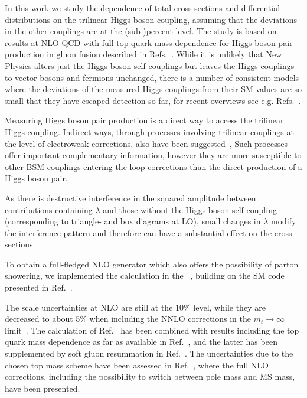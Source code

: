 \medskip

In this work we study the dependence of total cross sections and differential distributions on the trilinear Higgs boson coupling, assuming that the deviations in the other couplings are at the (sub-)percent level.
The study is based on results at NLO QCD with full top quark mass dependence for Higgs boson pair production in gluon fusion described in Refs.~\cite{Borowka:2016ehy,Borowka:2016ypz}. 
While it is unlikely that New Physics alters just the Higgs boson self-couplings but leaves the Higgs couplings to vector bosons and fermions unchanged, there is a number of consistent models where the deviations of the measured Higgs couplings from their SM values are so small that they have escaped detection so far, for recent overviews see e.g. Refs.~\cite{Cepeda:2019klc,Basler:2018dac}.

Measuring Higgs boson pair production is a direct way to access the trilinear Higgs coupling. Indirect ways, through processes involving trilinear couplings at the level of electroweak corrections, also have been suggested~\cite{Gorbahn:2019lwq,Nakamura:2018bli,Borowka:2018pxx,Kilian:2018bhs,Vryonidou:2018eyv,Maltoni:2018ttu,Maltoni:2017ims,Kribs:2017znd,Degrassi:2017ucl,Bizon:2016wgr,Degrassi:2016wml,Gorbahn:2016uoy,McCullough:2013rea}, 
Such processes offer important complementary information, however they are more susceptible to other BSM couplings entering the loop corrections than the direct production of a Higgs boson pair.

As there is destructive interference in the squared amplitude between contributions containing $\lambda$ and those without the Higgs boson self-coupling (corresponding to triangle- and box diagrams at LO), 
small changes in $\lambda$ modify the interference pattern and therefore can have a substantial effect on the cross sections.

To obtain a full-fledged NLO generator which also offers the possibility of parton showering, we implemented the calculation in the 
\powhegbox~\cite{Nason:2004rx,Frixione:2007vw,Alioli:2010xd}, building on the SM code presented in Ref.~\cite{Heinrich:2017kxx}.

The scale uncertainties at NLO are still at the 10\% level, while they are decreased to about 5\% when including the NNLO corrections
in the $m_t\to\infty$ limit~\cite{deFlorian:2013jea,Grigo:2015dia,deFlorian:2016uhr}. The calculation of Ref.~\cite{deFlorian:2016uhr} has been combined with results including the top quark mass dependence as far as available in Ref.~\cite{Grazzini:2018bsd}, and the latter has been supplemented by soft gluon resummation in Ref.~\cite{deFlorian:2018tah}. 
The uncertainties due to the chosen top mass scheme have been assessed in Ref.~\cite{Baglio:2018lrj}, where the full NLO corrections, including the possibility to switch between pole mass and $\overline{\mathrm{MS}}$ mass, have been presented.

